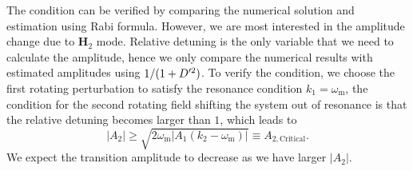 




The condition can be verified by comparing the numerical solution and estimation using Rabi formula. However, we are most interested in the amplitude change due to $\mathbf H_2$ mode. Relative detuning is the only variable that we need to calculate the amplitude, hence we only compare the numerical results with estimated amplitudes using $1/(1+D'^2)$.
To verify the condition, we choose the first rotating perturbation to satisfy the resonance condition $k_1=\omega_{\mathrm{m}}$, the condition for the second rotating field shifting the system out of resonance is that the relative detuning becomes larger than $1$, which leads to
\begin{equation}
\lvert A_2 \rvert \geq \sqrt{2\omega_{\mathrm{m}} \lvert A_1 (k_2-\omega_{\mathrm m})\rvert} \equiv A_{2,\mathrm{Critical}}.
\end{equation}
We expect the transition amplitude to decrease as we have larger $\lvert A_2\rvert$.


